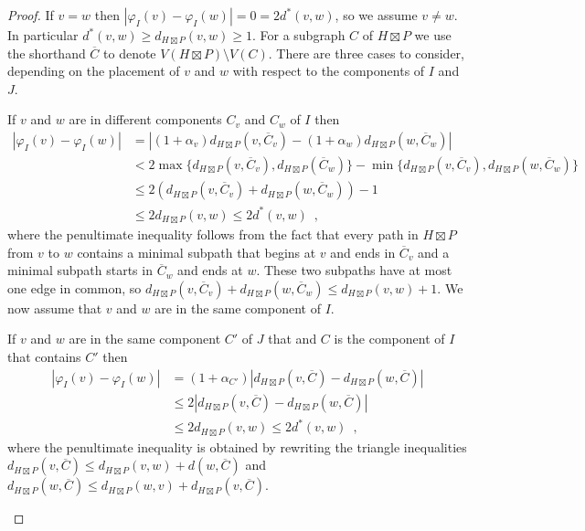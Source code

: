 \documentclass{patmorin}
\renewcommand{\ge}{\geqslant}
\renewcommand{\le}{\leqslant}
\newcommand{\pat}[1]{\textcolor{Maroon}{Pat: #1}}
\begin{document}
\begin{proof}
  If $v=w$ then $|\varphi_I(v)-\varphi_I(w)|=0 = 2 d^*(v,w)$, so we assume $v\neq w$. In particular $d^*(v,w)\ge d_{H\boxtimes P}(v,w)\ge 1$.
  For a subgraph $C$ of $H\boxtimes P$ we use the shorthand $\overline{C}$ to denote $V(H\boxtimes P)\setminus V(C)$. There are three cases to consider, depending on the placement of $v$ and $w$ with respect to the components of $I$ and $J$.

  \begin{compactenum}
    \item  If $v$ and $w$ are in different components $C_v$ and $C_w$ of $I$ then
    \begin{align*}
       |\varphi_I(v)-\varphi_I(w)|
      & =|(1+\alpha_v)d_{H\boxtimes P}(v,\overline{C}_v)-(1+\alpha_w)d_{H\boxtimes P}(w,\overline{C}_w)| \\
      & < 2\max\{d_{H\boxtimes P}(v,\overline{C}_v), d_{H\boxtimes P}(\overline{C}_w)\}
      - \min\{d_{H\boxtimes P}(v,\overline{C}_v), d_{H\boxtimes P}(w,\overline{C}_w)\} \\
      & \le 2\left(d_{H\boxtimes P}(v,\overline{C}_v) + d_{H\boxtimes P}(w,\overline{C}_w)\right) - 1\\
      & \le 2d_{H\boxtimes P}(v,w) \le 2d^*(v,w) \enspace ,
    \end{align*}
    where the penultimate inequality follows from the fact that every path in $H\boxtimes P$ from $v$ to $w$ contains a minimal subpath that begins at $v$ and ends in $\overline{C}_v$ and a minimal subpath starts in $\overline{C}_w$ and ends at $w$.  These two subpaths have at most one edge in common, so
    $d_{H\boxtimes P}(v,\overline{C}_v) + d_{H\boxtimes P}(w,\overline{C}_w) \le d_{H\boxtimes P}(v,w)+1$.  We now  assume that $v$ and $w$ are in the same component of $I$.

    \item If $v$ and $w$ are in the same component $C'$ of $J$ that and $C$ is the component of $I$ that contains $C'$ then
    \begin{align*}
      |\varphi_I(v)-\varphi_I(w)|
      & =(1+\alpha_{C'})|d_{H\boxtimes P}(v,\overline{C})-d_{H\boxtimes P}(w,\overline{C})| \\
      & \le 2|d_{H\boxtimes P}(v,\overline{C})-d_{H\boxtimes P}(w,\overline{C})| \\
      & \le 2 d_{H\boxtimes P}(v,w) \le 2d^*(v,w) \enspace ,
    \end{align*}
    where the penultimate inequality is obtained by rewriting the triangle inequalities $d_{H\boxtimes P}(v,\overline{C})\le d_{H\boxtimes P}(v,w)+d(w,\overline{C})$ and $d_{H\boxtimes P}(w,\overline{C})\le d_{H\boxtimes P}(w,v)+d_{H\boxtimes P}(v,\overline{C})$.


\end{compactenum}
\end{proof}
\end{document}
